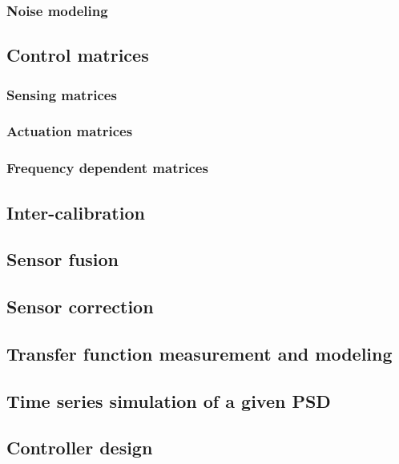 \subsubsection{Noise modeling \label{sec:noise_modeling_baseline}}
\subsection{Control matrices}
\subsubsection{Sensing matrices}
\subsubsection{Actuation matrices}
\subsubsection{Frequency dependent matrices}
\subsection{Inter-calibration}
\subsection{Sensor fusion}
\subsection{Sensor correction}
\subsection{Transfer function measurement and modeling}
\subsection{Time series simulation of a given PSD}
\subsection{Controller design}

